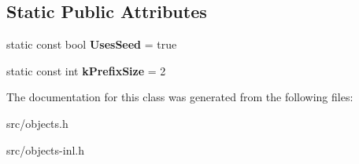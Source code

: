 \subsection*{Static Public Attributes}
\begin{DoxyCompactItemize}
\item 
\hypertarget{classv8_1_1internal_1_1_seeded_number_dictionary_shape_aeef83de57b6cced5e74cd1032b9dd4c9}{}static const bool {\bfseries Uses\+Seed} = true\label{classv8_1_1internal_1_1_seeded_number_dictionary_shape_aeef83de57b6cced5e74cd1032b9dd4c9}

\item 
\hypertarget{classv8_1_1internal_1_1_seeded_number_dictionary_shape_a25afb78928f0df8903f54cb9bd5c704b}{}static const int {\bfseries k\+Prefix\+Size} = 2\label{classv8_1_1internal_1_1_seeded_number_dictionary_shape_a25afb78928f0df8903f54cb9bd5c704b}

\end{DoxyCompactItemize}


The documentation for this class was generated from the following files\+:\begin{DoxyCompactItemize}
\item 
src/objects.\+h\item 
src/objects-\/inl.\+h\end{DoxyCompactItemize}
